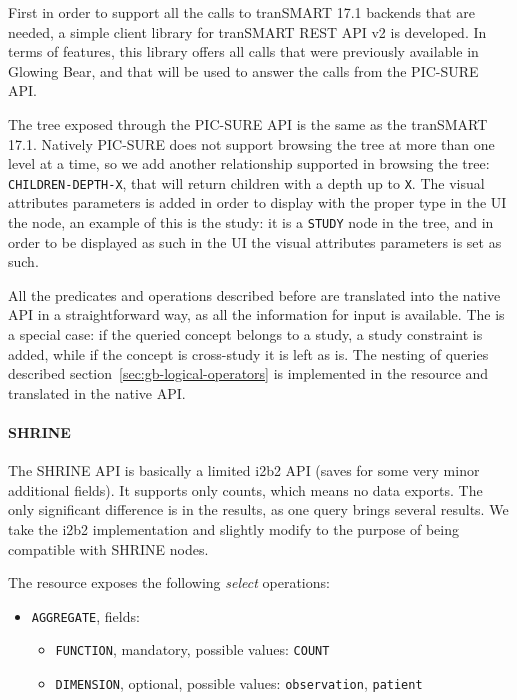 First in order to support all the calls to tranSMART 17.1 backends that are needed, a simple client library for tranSMART REST API v2 is developed.
In terms of features, this library offers all calls that were previously available in Glowing Bear, and that will be used to answer the calls from the PIC-SURE API.

The tree exposed through the PIC-SURE API is the same as the tranSMART 17.1.
Natively PIC-SURE does not support browsing the tree at more than one level at a time, so we add another relationship supported in browsing the tree: \verb|CHILDREN-DEPTH-X|, that will return children with a depth up to \verb|X|.
The visual attributes parameters is added in order to display with the proper type in the UI the node, an example of this is the study: it is a \verb|STUDY| node in the tree, and in order to be displayed as such in the UI the visual attributes parameters is set as such.

All the predicates and operations described before are translated into the native API in a straightforward way, as all the information for input is available.
The is a special case: if the queried concept belongs to a study, a study constraint is added, while if the concept is cross-study it is left as is.
The nesting of queries described section~\ref{sec:gb-logical-operators} is implemented in the resource and translated in the native API.

\paragraph{SHRINE}
The SHRINE API is basically a limited i2b2 API (saves for some very minor additional fields).
It supports only counts, which means no data exports.
The only significant difference is in the results, as one query brings several results.
We take the i2b2 implementation and slightly modify to the purpose of being compatible with SHRINE nodes.

The resource exposes the following \emph{select} operations:
\begin{itemize}
    \item \verb|AGGREGATE|, fields:
    \begin{itemize}
        \item \verb|FUNCTION|, mandatory, possible values:
        \verb|COUNT|
        
        \item \verb|DIMENSION|, optional, possible values:
        \verb|observation|,
        \verb|patient|
    \end{itemize}
\end{itemize}

